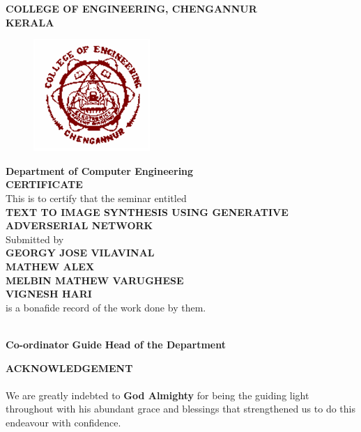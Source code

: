 \documentclass[a4paper,12pt,oneside]{article}
\begin{document}
\newpage
\thispagestyle{empty}
\begin{center}
\setlength{\baselineskip}{1.5\baselineskip}
{\large\textbf{COLLEGE OF ENGINEERING, CHENGANNUR}}
\\
{\large\textbf{KERALA}}
\\
\begin{figure}[H]
\centering
\includegraphics{ceclogo.png}
\end{figure}
\setlength{\baselineskip}{1.5\baselineskip}
\textbf{Department of Computer Engineering}
\\
\textbf{CERTIFICATE}
\\
This is to certify that the seminar entitled
\\
\textbf{TEXT TO IMAGE SYNTHESIS USING GENERATIVE ADVERSERIAL NETWORK}
\\
Submitted by
\\
\textbf{GEORGY JOSE VILAVINAL}
\\
\textbf{MATHEW ALEX}
\\
\textbf{MELBIN MATHEW VARUGHESE}
\\
\textbf{VIGNESH HARI}
\\
is a bonafide record of the work done by them.
\end{center}
\vspace{20ex}
\hspace{55ex}
\\

\hspace{0ex}
\textbf{Co-ordinator}
\hspace{18ex}
\textbf{Guide}
\hspace{18ex}
\textbf{Head of the Department}
\newpage
{}
\renewcommand{\headrulewidth}{0.0pt}
\renewcommand{\footrulewidth}{0.0pt}
\begin{center}
\large{\textbf{ACKNOWLEDGEMENT}}
\end{center}
\vspace{6ex}
\setlength{\baselineskip}{1.5\baselineskip}
\paragraph{}
We are greatly indebted to \textbf{God Almighty} for being the guiding light throughout with his
abundant grace and blessings that strengthened us to do this endeavour with confidence.
\end{document}
